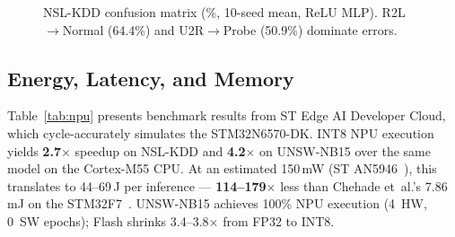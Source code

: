 \documentclass[conference]{IEEEtran}
\begin{document}
\begin{figure}[t]
\caption{NSL-KDD confusion matrix (\%, 10-seed mean, ReLU MLP).
R2L$\to$Normal (64.4\%) and U2R$\to$Probe (50.9\%) dominate errors.}
\label{fig:cm}
\end{figure}

\subsection{Energy, Latency, and Memory}

\begin{table}[t]
\centering
\caption{NPU benchmark on STM32N6570-DK. Energy estimated from
AN5946~\cite{st_an5946} (${\sim}$150\,mW at nominal frequency);
FP32 CPU-only power differs and is not estimated (---).}
\label{tab:npu}
\small
{}
\end{table}

Table~\ref{tab:npu} presents benchmark results from ST Edge AI
Developer Cloud, which cycle-accurately simulates the STM32N6570-DK.
INT8 NPU execution yields \textbf{2.7$\times$} speedup on NSL-KDD
and \textbf{4.2$\times$} on UNSW-NB15 over the same model on
the Cortex-M55 CPU.
At an estimated 150\,mW (ST AN5946~\cite{st_an5946}), this translates
to 44--69\,\textmu J per inference ---
\textbf{114--179$\times$} less than Chehade et~al.'s 7.86\,mJ on
the STM32F7~\cite{chehade2025stm32}.
UNSW-NB15 achieves 100\% NPU execution (4~HW, 0~SW epochs);
Flash shrinks 3.4--3.8$\times$ from FP32 to INT8.
\end{document}
